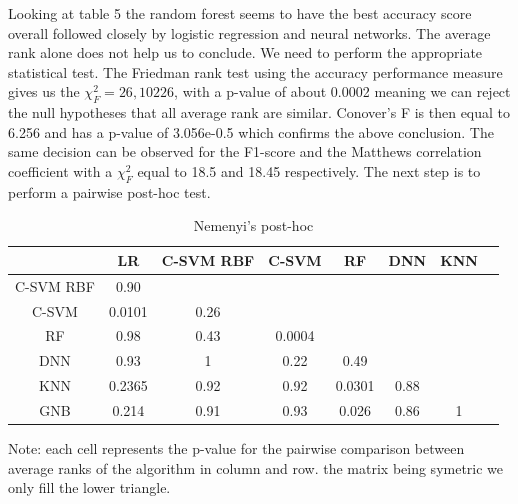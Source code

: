 \documentclass[a4paper,12pt]{article}
\numberwithin{equation}{section}
\begin{document}
Looking at table 5 the random forest seems to have the best accuracy score overall followed closely by logistic regression and neural networks. The average rank alone does not help us to conclude. We need to perform the appropriate statistical test. The Friedman rank test using the accuracy performance measure gives us the $\chi^2_F = 26,10226$, with a p-value of about 0.0002 meaning we can reject the null hypotheses that all average rank are similar. Conover's F is then equal to 6.256 and has a p-value of 3.056e-0.5 which confirms the above conclusion. The same decision can be observed for the F1-score and the Matthews correlation coefficient with a $\chi^2_F$ equal to 18.5 and 18.45 respectively. The next step is to perform a pairwise post-hoc test.  

\begin{table}[H]
\begin{center}
\caption{Nemenyi's post-hoc}
\begin{threeparttable}
\begin{tabular}{ |c|c|c|c|c|c|c|c| } 
 \hline
  & LR & C-SVM RBF & C-SVM & RF & DNN & KNN  \\ 
 \hline 
 C-SVM RBF & 0.90 & & & & & \\[1pt]
 C-SVM  & 0.0101 & 0.26 & & & &  \\[1pt]
 RF & 0.98 & 0.43 & 0.0004& & & \\[1pt]
 DNN & 0.93 & 1 & 0.22 & 0.49 & & \\[1pt]
 KNN & 0.2365 & 0.92 & 0.92 & 0.0301 & 0.88 & \\[1pt]
 GNB & 0.214 & 0.91 & 0.93 & 0.026 & 0.86 & 1 \\[1pt]
 \hline

\end{tabular}
\begin{tablenotes}
\small
\item   Note: each cell represents the p-value for the pairwise comparison between average ranks of the algorithm in column and row. the matrix being symetric we only fill the lower triangle. 
\end{tablenotes}
\end{threeparttable}
\label{table:6}
\end{center}
\end{table}
\end{document}
